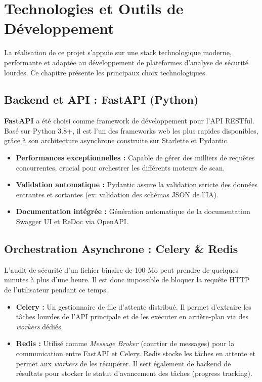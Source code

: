 \chapter{Technologies et Outils de Développement}
\label{chap:technologies}

La réalisation de ce projet s'appuie sur une stack technologique moderne, performante et adaptée au développement de plateformes d'analyse de sécurité lourdes. Ce chapitre présente les principaux choix technologiques.

\section{Backend et API : FastAPI (Python)}
\textbf{FastAPI} a été choisi comme framework de développement pour l'API RESTful. Basé sur Python 3.8+, il est l'un des frameworks web les plus rapides disponibles, grâce à son architecture asynchrone construite sur Starlette et Pydantic.

\begin{tcolorbox}[infobox, title={Pourquoi FastAPI ?}]
\begin{itemize}[label=\textcolor{PrimaryBlue}{\faCheckCircle}]
    \item \textbf{Performances exceptionnelles :} Capable de gérer des milliers de requêtes concurrentes, crucial pour orchestrer les différents moteurs de scan.
    \item \textbf{Validation automatique :} Pydantic assure la validation stricte des données entrantes et sortantes (ex: validation des schémas JSON de l'IA).
    \item \textbf{Documentation intégrée :} Génération automatique de la documentation Swagger UI et ReDoc via OpenAPI.
\end{itemize}
\end{tcolorbox}

\section{Orchestration Asynchrone : Celery \& Redis}
L'audit de sécurité d'un fichier binaire de 100 Mo peut prendre de quelques minutes à plus d'une heure. Il est donc impossible de bloquer la requête HTTP de l'utilisateur pendant ce temps.

\begin{itemize}[label=\textcolor{PrimaryBlue}{\faCogs}]
    \item \textbf{Celery :} Un gestionnaire de file d'attente distribué. Il permet d'extraire les tâches lourdes de l'API principale et de les exécuter en arrière-plan via des \textit{workers} dédiés.
    \item \textbf{Redis :} Utilisé comme \textit{Message Broker} (courtier de messages) pour la communication entre FastAPI et Celery. Redis stocke les tâches en attente et permet aux \textit{workers} de les récupérer. Il sert également de backend de résultats pour stocker le statut d'avancement des tâches (progress tracking).
\end{itemize}

